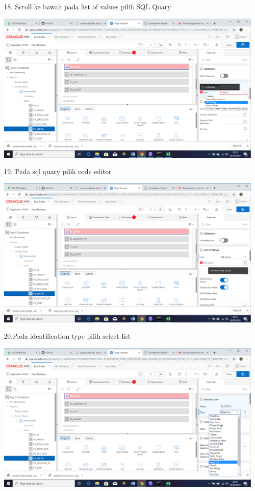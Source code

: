 \documentclass{article}
\begin{document}
\item 18. Scroll ke bawah pada list of values pilih  SQL Quary
\begin{center}
    \includegraphics[width=10cm\textwidth]{figure/34.png}
\end{center}

\item 19. Pada sql quary pilih code editor
\begin{center}
    \includegraphics[width=10cm\textwidth]{figure/35.png}
\end{center}

\item 20.Pada identification type pilih select list

\begin{center}
    \includegraphics[width=10cm\textwidth]{figure/33.png}
\end{center}
\end{document}
